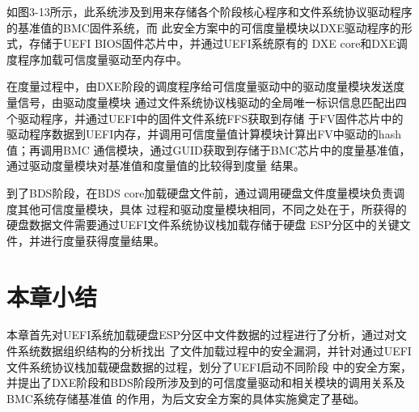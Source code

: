 如图3-13所示，此系统涉及到用来存储各个阶段核心程序和文件系统协议驱动程序的基准值的BMC固件系统，而
此安全方案中的可信度量模块以DXE驱动程序的形式，存储于UEFI BIOS固件芯片中，并通过UEFI系统原有的
DXE core和DXE调度程序加载可信度量驱动至内存中。
\par 在度量过程中，由DXE阶段的调度程序给可信度量驱动中的驱动度量模块发送度量信号，由驱动度量模块
通过文件系统协议栈驱动的全局唯一标识信息匹配出四个驱动程序，并通过UEFI中的固件文件系统FFS获取到存储
于FV固件芯片中的驱动程序数据到UEFI内存，并调用可信度量值计算模块计算出FV中驱动的hash值；再调用BMC
通信模块，通过GUID获取到存储于BMC芯片中的度量基准值，通过驱动度量模块对基准值和度量值的比较得到度量
结果。
\par 到了BDS阶段，在BDS core加载硬盘文件前，通过调用硬盘文件度量模块负责调度其他可信度量模块，具体
过程和驱动度量模块相同，不同之处在于，所获得的硬盘数据文件需要通过UEFI文件系统协议栈加载存储于硬盘
ESP分区中的关键文件，并进行度量获得度量结果。

%
%
\section{本章小结}
本章首先对UEFI系统加载硬盘ESP分区中文件数据的过程进行了分析，通过对文件系统数据组织结构的分析找出
了文件加载过程中的安全漏洞，并针对通过UEFI文件系统协议栈加载硬盘数据的过程，划分了UEFI启动不同阶段
中的安全方案，并提出了DXE阶段和BDS阶段所涉及到的可信度量驱动和相关模块的调用关系及BMC系统存储基准值
的作用，为后文安全方案的具体实施奠定了基础。

\bjutclearpage

